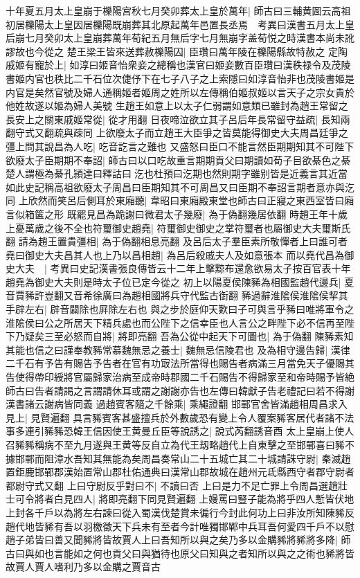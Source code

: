 十年夏五月太上皇崩于櫟陽宫秋七月癸卯葬太上皇於萬年|{
	師古曰三輔黄圖云高祖初居櫟陽太上皇因居櫟陽既崩葬其北原起萬年邑置長丞焉　考異曰漢書五月太上皇后崩七月癸卯太上皇崩葬萬年荀紀五月無后字七月無崩字盖荀悦之時漢書本尚未訛謬故也今從之}
楚王梁王皆來送葬赦櫟陽囚|{
	臣瓚曰萬年陵在櫟陽縣故特赦之}
定陶戚姬有寵於上|{
	如淳曰姬音怡衆妾之總稱也漢官曰姬妾數百臣瓚曰漢秩禄令及茂陵書姬内官也秩比二千石位次倢伃下在七子八子之上索隱曰如淳音怡非也茂陵書姬是内官是矣然官號及婦人通稱姬者姬周之姓所以左傳稱伯姬叔姬以言天子之宗女貴於他姓故遂以姬為婦人美號}
生趙王如意上以太子仁弱謂如意類已雖封為趙王常留之長安上之關東戚姬常從|{
	從才用翻}
日夜啼泣欲立其子呂后年長常留守益疏|{
	長知兩翻守式又翻疏與疎同}
上欲廢太子而立趙王大臣爭之皆莫能得御史大夫周昌廷爭之彊上問其說昌為人吃|{
	吃音訖言之難也}
又盛怒曰臣口不能言然臣期期知其不可陛下欲廢太子臣期期不奉詔|{
	師古曰以口吃故重言期期貢父曰期讀如荀子目欲綦色之綦楚人謂極為綦孔頴達曰釋詁曰汔也杜預曰汔期也然則期字雖别皆是近義言其近當如此史記稱高祖欲廢太子周昌曰臣期知其不可周昌又曰臣期不奉詔言期者意亦與汔同}
上欣然而笑呂后側耳於東廂聽|{
	韋昭曰東廂殿東堂也師古曰正寢之東西室皆曰廂言似箱箧之形}
既罷見昌為跪謝曰微君太子幾廢|{
	為于偽翻幾居依翻}
時趙王年十歲上憂萬歲之後不全也符璽御史趙堯|{
	符璽御史御史之掌符璽者也屬御史大夫璽斯氏翻}
請為趙王置貴彊相|{
	為于偽翻相息亮翻}
及呂后太子羣臣素所敬憚者上曰誰可者堯曰御史大夫昌其人也上乃以昌相趙|{
	為呂后殺戚夫人及如意張本}
而以堯代昌為御史大夫　|{
	考異曰史記漢書張良傳皆云十二年上擊黥布還愈欲易太子按百官表十年趙堯為御史大夫則是時太子位已定今從之}
初上以陽夏侯陳豨為相國監趙代邊兵|{
	夏音賈豨許豈翻又音希徐廣曰為趙相國將兵守代監古衘翻}
豨過辭淮隂侯淮隂侯挈其手辟左右|{
	辟音闢除也屛除左右也}
與之步於庭仰天歎曰子可與言乎豨曰唯將軍令之淮隂侯曰公之所居天下精兵處也而公陛下之信幸臣也人言公之畔陛下必不信再至陛下乃疑矣三至必怒而自將|{
	將即亮翻}
吾為公從中起天下可圖也|{
	為于偽翻}
陳豨素知其能也信之曰謹奉教豨常慕魏無忌之養士|{
	魏無忌信陵君也}
及為相守邊告歸|{
	漢律二千石有予告有賜告予告者在官有功㝡法所當得也賜告者病滿三月當免天子優賜其告使得帶印綬將官屬歸家治病至成帝時郡國二千石賜告不得歸家至和帝時賜予皆絶師古曰告者請謁之言謂請休耳或謂之謝謝亦告也左傳曰韓獻子告老禮記曰若不得謝漢書諸云謝病皆同義}
過趙賓客隨之千餘乘|{
	乘繩證翻}
邯鄲官舍皆滿趙相周昌求入見上|{
	見賢遍翻}
具言豨賓客甚盛擅兵於外數歲恐有變上令人覆案豨客居代者諸不法事多連引豨豨恐韓王信因使王黄曼丘臣等說誘之|{
	說式芮翻誘音酉}
太上皇崩上使人召豨豨稱病不至九月遂與王黄等反自立為代王刼略趙代上自東擊之至邯鄲喜曰豨不據邯鄲而阻漳水吾知其無能為矣周昌奏常山二十五城亡其二十城請誅守尉|{
	秦滅趙置鉅鹿邯鄲郡漢始置常山郡杜佑通典曰漢常山郡故城在趙州元氐縣西守者郡守尉者都尉守式又翻}
上曰守尉反乎對曰不|{
	不讀曰否}
上曰是力不足亡罪上令周昌選趙壯士可令將者白見四人|{
	將即亮翻下同見賢遍翻}
上嫚罵曰豎子能為將乎四人慙皆伏地上封各千戶以為將左右諫曰從入蜀漢伐楚賞未徧行今封此何功上曰非汝所知陳豨反趙代地皆豨有吾以羽檄徵天下兵未有至者今計唯獨邯鄲中兵耳吾何愛四千戶不以慰趙子弟皆曰善又聞豨將皆故賈人上曰吾知所以與之矣乃多以金購豨將豨將多降|{
	師古曰與如也言能如之何也貢父曰與猶待也原父曰知與之者知所以與之之術也豨將皆故賈人賈人嗜利乃多以金購之賈音古}


